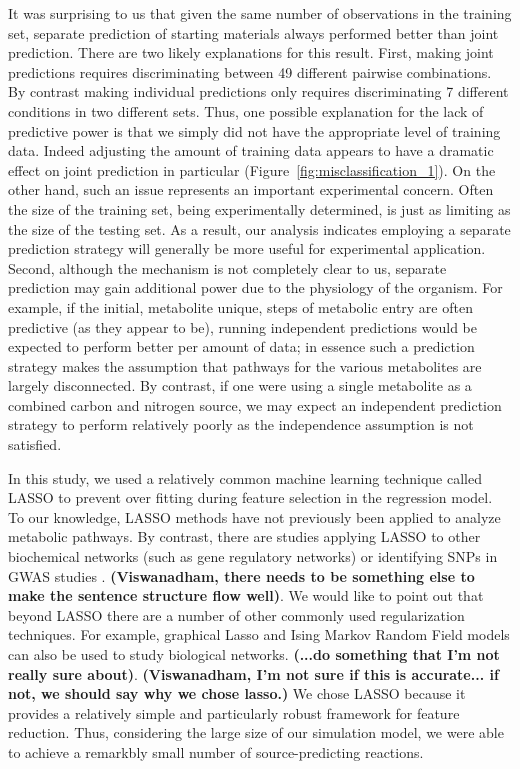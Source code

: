 \documentclass[12pt]{article}
\begin{document}
It was surprising to us that given the same number of observations in the training set, separate prediction of starting materials always performed better than joint prediction. There are two likely explanations for this result. First, making joint predictions requires discriminating between 49 different pairwise combinations. By contrast making individual predictions only requires discriminating 7 different conditions in two different sets. Thus, one possible explanation for the lack of predictive power is that we simply did not have the appropriate level of training data. Indeed adjusting the amount of training data appears to have a dramatic effect on joint prediction in particular (Figure~\ref{fig:misclassification_1}). On the other hand, such an issue represents an important experimental concern. Often the size of the training set, being experimentally determined, is just as limiting as the size of the testing set. As a result, our analysis indicates employing a separate prediction strategy will generally be more useful for experimental application. Second, although the mechanism is not completely clear to us, separate prediction may gain additional power due to the physiology of the organism. For example, if the initial, metabolite unique, steps of metabolic entry are often predictive (as they appear to be), running independent predictions would be expected to perform better per amount of data; in essence such a prediction strategy makes the assumption that pathways for the various metabolites are largely disconnected. By contrast, if one were using a single metabolite as a combined carbon and nitrogen source, we may expect an independent prediction strategy to perform relatively poorly as the independence assumption is not satisfied.

In this study, we used a relatively common machine learning technique called LASSO to prevent over fitting during feature selection in the regression model. To our knowledge, LASSO methods have not previously been applied to analyze metabolic pathways. By contrast, there are studies applying LASSO to other biochemical networks (such as gene regulatory networks) \cite{Menendezetal2010} or identifying SNPs in GWAS studies \cite{Wuetal2009}. \textbf{(Viswanadham, there needs to be something else to make the sentence structure flow well)}. We would like to point out that beyond LASSO there are a number of other commonly used regularization techniques. For example, graphical Lasso \cite{Friedmanetal2008} and Ising Markov Random Field models \cite{Ravikumaretal2010} can also be used to study biological networks. \textbf{(...do something that I'm not really sure about)}. \textbf{(Viswanadham, I'm not sure if this is accurate... if not, we should say why we chose lasso.)} We chose LASSO because it provides a relatively simple and particularly robust framework for feature reduction. Thus, considering the large size of our simulation model, we were able to achieve a remarkbly small number of source-predicting reactions.
\end{document}
